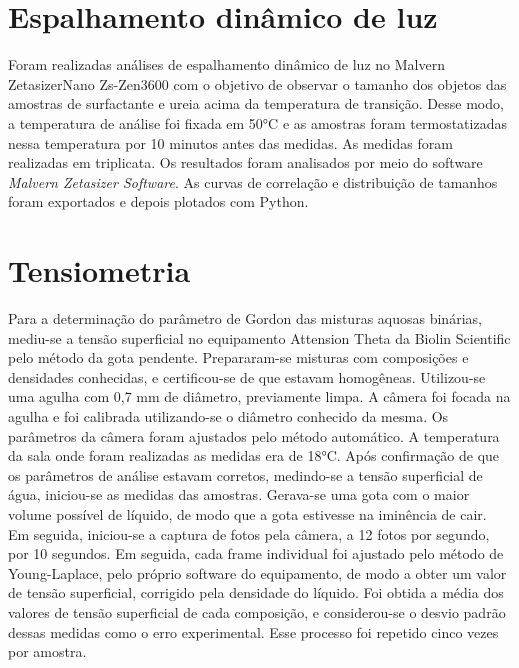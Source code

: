 		\section{Espalhamento dinâmico de luz} 
		
		Foram realizadas análises de espalhamento dinâmico de luz no Malvern ZetasizerNano Zs-Zen3600 com o objetivo de observar o tamanho dos objetos das amostras de surfactante e ureia acima da temperatura de transição. Desse modo, a temperatura de análise foi fixada em 50°C e as amostras foram termostatizadas nessa temperatura por 10 minutos antes das medidas. As medidas foram realizadas em triplicata. Os resultados foram analisados por meio do software \emph{Malvern Zetasizer Software}. As curvas de correlação e distribuição de tamanhos foram exportados e depois plotados com Python.
		
		\section{Tensiometria} 
		
		Para a determinação do parâmetro de Gordon das misturas aquosas binárias, mediu-se a tensão superficial no equipamento Attension Theta da Biolin Scientific pelo método da gota pendente. Prepararam-se misturas com composições e densidades conhecidas, e certificou-se de que estavam homogêneas. Utilizou-se uma agulha com 0,7 mm de diâmetro, previamente limpa. A câmera foi focada na agulha e foi calibrada utilizando-se o diâmetro conhecido da mesma. Os parâmetros da câmera foram ajustados pelo método automático. A temperatura da sala onde foram realizadas as medidas era de 18°C. Após confirmação de que os parâmetros de análise estavam corretos, medindo-se a tensão superficial de água, iniciou-se as medidas das amostras. Gerava-se uma gota com o maior volume possível de líquido, de modo que a gota estivesse na iminência de cair. Em seguida, iniciou-se a captura de fotos pela câmera, a 12 fotos por segundo, por 10 segundos. Em seguida, cada frame individual foi ajustado pelo método de Young-Laplace, pelo próprio software do equipamento, de modo a obter um valor de tensão superficial, corrigido pela densidade do líquido. Foi obtida a média dos valores de tensão superficial de cada composição, e considerou-se o desvio padrão dessas medidas como o erro experimental. Esse processo foi repetido cinco vezes por amostra.